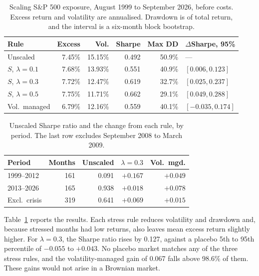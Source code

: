 \documentclass[10pt,twocolumn,letterpaper]{article}
\begin{document}
\begin{table}[h]
\centering
\caption{Scaling S\&P 500 exposure, August 1999 to September 2026, before costs. Excess return and volatility are annualised. Drawdown is of total return, and the interval is a six-month block bootstrap.}
\label{tab:rule}
\footnotesize
\setlength{\tabcolsep}{3pt}
\begin{tabular}{lrrrrl}
\toprule
Rule & Excess & Vol. & Sharpe & Max DD & $\Delta$Sharpe, 95\% \\
\midrule
Unscaled & 7.45\% & 15.15\% & 0.492 & 50.9\% & --- \\
$S$, $\lambda = 0.1$ & 7.68\% & 13.93\% & 0.551 & 40.9\% & $[0.006, 0.123]$ \\
$S$, $\lambda = 0.3$ & 7.72\% & 12.47\% & 0.619 & 32.7\% & $[0.025, 0.237]$ \\
$S$, $\lambda = 0.5$ & 7.75\% & 11.71\% & 0.662 & 29.1\% & $[0.049, 0.288]$ \\
Vol.\ managed & 6.79\% & 12.16\% & 0.559 & 40.1\% & $[-0.035, 0.174]$ \\
\bottomrule
\end{tabular}
\end{table}

\begin{table}[h]
\centering
\caption{Unscaled Sharpe ratio and the change from each rule, by period. The last row excludes September 2008 to March 2009.}
\label{tab:sub}
\footnotesize
\setlength{\tabcolsep}{4pt}
\begin{tabular}{lrrrr}
\toprule
Period & Months & Unscaled & $\lambda = 0.3$ & Vol.\ mgd. \\
\midrule
1999--2012 & 161 & 0.091 & $+0.167$ & $+0.049$ \\
2013--2026 & 165 & 0.938 & $+0.018$ & $+0.078$ \\
Excl.\ crisis & 319 & 0.641 & $+0.069$ & $+0.015$ \\
\bottomrule
\end{tabular}
\end{table}

Table~\ref{tab:rule} reports the results. Each stress rule reduces volatility and drawdown and, because stressed months had low returns, also leaves mean excess return slightly higher. For $\lambda = 0.3$, the Sharpe ratio rises by 0.127, against a placebo 5th to 95th percentile of $-0.055$ to $+0.043$. No placebo market matches any of the three stress rules, and the volatility-managed gain of 0.067 falls above 98.6\% of them. These gains would not arise in a Brownian market.
\end{document}

